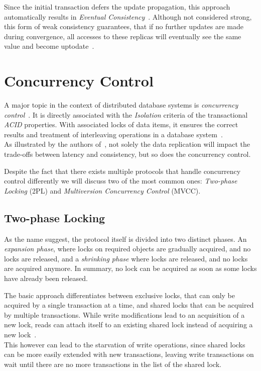 Since the initial transaction defers the update propagation, this approach automatically results in \emph{Eventual Consistency}~\cite{shapiro:2011}.
Although not considered strong, this form of weak consistency guarantees, that if no further updates are made 
during convergence, all accesses to these replicas will eventually see the same value and become uptodate~\cite{quorums:2003}.




\section{Concurrency Control}
\label{sec:concurrency_control}

A major topic in the context of distributed database systems is \emph{concurrency control}~\cite{bernstein:1981}.
It is directly associated with the \emph{Isolation} criteria of the transactional \emph{ACID} properties.
With associated locks of data items, it ensures the correct results and treatment of interleaving operations in a database system~\cite{bernstein:1986}.
\\
As illustrated by the authors of~\cite{weikum:2001}, not solely the data replication will impact the trade-offs between latency and consistency,
but so does the concurrency control.

Despite the fact that there exists multiple protocols that handle concurrency control differently we will discuss two of the most common ones: 
\emph{Two-phase Locking} (2PL) and \emph{Multiversion Concurrency Control} (MVCC).




\subsection{Two-phase Locking}

As the name suggest, the protocol itself is divided into two distinct phases. An \emph{expansion phase}, where locks on required objects are gradually acquired, 
and no locks are released, and a \emph{shrinking phase} where locks are released, and no locks are acquired anymore.
In summary, no lock can be acquired as soon as some locks have already been released.

The basic approach differentiates between exclusive locks, that can only be acquired by a single transaction at a time, and shared locks that 
can be acquired by multiple transactions. While write modifications lead to an acquisition of a new lock, reads can attach itself to an existing shared lock 
instead of acquiring a new lock~\cite{mehrotra:1997}. \\
This however can lead to the starvation of write operations, since shared locks can be more easily extended with new transactions, leaving write transactions on wait until 
there are no more transactions in the list of the shared lock. 

